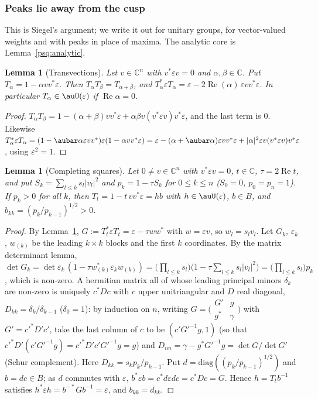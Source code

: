 \documentclass[10pt]{amsart}
\newtheorem{lemma}[theorem]{Lemma}
\theoremstyle{definition}
\theoremstyle{remark}
\newcommand{\C}{\mathbb C}
\newcommand{\Rel}{\operatorname{Re}}
\begin{document}
\subsubsection{Peaks lie away from the cusp}\label{psq:ss-P}

This is Siegel's argument; we write it out for unitary groups, for vector-valued weights and with
peaks in place of maxima. The analytic core is Lemma~\ref{psq:analytic}.

\begin{lemma}[Transvections]\label{psq:transv}
Let $v\in\C^n$ with $v^*\varepsilon v=0$ and $\alpha,\beta\in\C$. Put $T_\alpha=1-\alpha vv^*\varepsilon$.
Then $T_\alpha T_\beta=T_{\alpha+\beta}$, and $T_\alpha^*\varepsilon T_\alpha=\varepsilon-2\Rel(\alpha)\,
\varepsilon vv^*\varepsilon$. In particular $T_\alpha\in\auU(\varepsilon)$ if $\Rel\alpha=0$.
\end{lemma}
\begin{proof}
$T_\alpha T_\beta=1-(\alpha+\beta)vv^*\varepsilon+\alpha\beta v(v^*\varepsilon v)v^*\varepsilon$, and the
last term is $0$. Likewise $T_\alpha^*\varepsilon T_\alpha=(1-\aubar\alpha\varepsilon vv^*)\varepsilon(1-
\alpha vv^*\varepsilon)=\varepsilon-(\alpha+\aubar\alpha)\varepsilon vv^*\varepsilon+|\alpha|^2\varepsilon
v(v^*\varepsilon v)v^*\varepsilon$, using $\varepsilon^2=1$.
\end{proof}

\begin{lemma}[Completing squares]\label{psq:factor}
Let $0\ne v\in\C^n$ with $v^*\varepsilon v=0$, $t\in\C$, $\tau=2\Rel t$, and put $S_k=\sum_{l\le k}s_l|v_l|^2$
and $p_k=1-\tau S_k$ for $0\le k\le n$ \textup($S_0=0$, $p_0=p_n=1$\textup). If $p_k>0$ for all $k$,
then $T_t=1-t\,vv^*\varepsilon=hb$ with $h\in\auU(\varepsilon)$, $b\in B$, and $b_{kk}=(p_k/p_{k-1})^{1/2}>0$.
\end{lemma}
\begin{proof}
By Lemma~\ref{psq:transv}, $G:=T_t^*\varepsilon T_t=\varepsilon-\tau ww^*$ with $w=\varepsilon v$, so
$w_l=s_lv_l$. Let $G_k$, $\varepsilon_k$, $w_{(k)}$ be the leading $k\times k$ blocks and the first $k$
coordinates. By the matrix determinant lemma, $\det G_k=\det\varepsilon_k\,(1-\tau w_{(k)}^*\varepsilon_k
w_{(k)})=\bigl(\prod_{l\le k}s_l\bigr)\bigl(1-\tau\sum_{l\le k}s_l|v_l|^2\bigr)=\bigl(\prod_{l\le k}s_l
\bigr)p_k$, which is non-zero. A hermitian matrix all of whose leading principal minors $\delta_k$ are
non-zero is uniquely $c^*Dc$ with $c$ upper unitriangular and $D$ real diagonal, $D_{kk}=\delta_k/
\delta_{k-1}$ ($\delta_0=1$): by induction on $n$, writing $G=\bigl(\begin{smallmatrix}G'&g\\g^*&
\gamma\end{smallmatrix}\bigr)$ with $G'=c'^*D'c'$, take the last column of $c$ to be
$(c'G'^{-1}g,1)$ (so that $c'^*D'(c'G'^{-1}g)=c'^*D'c'G'^{-1}g=g$) and $D_{nn}=\gamma-g^*G'^{-1}g=\det G/\det G'$ (Schur complement). Here
$D_{kk}=s_kp_k/p_{k-1}$. Put $d=\mathrm{diag}((p_k/p_{k-1})^{1/2})$ and $b=dc\in B$; as $d$ commutes
with $\varepsilon$, $b^*\varepsilon b=c^*d\varepsilon dc=c^*Dc=G$. Hence $h=T_tb^{-1}$ satisfies
$h^*\varepsilon h=b^{-*}Gb^{-1}=\varepsilon$, and $b_{kk}=d_{kk}$.
\end{proof}
\end{document}
